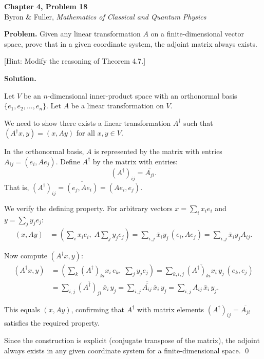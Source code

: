 \documentclass[12pt]{article}
\begin{document}
\begin{center}
{\Large\bfseries Chapter 4, Problem 18}\\[6pt]
Byron \& Fuller, \textit{Mathematics of Classical and Quantum Physics}
\end{center}

\bigskip

\textbf{Problem.} Given any linear transformation $A$ on a finite-dimensional vector space, prove that in a given coordinate system, the adjoint matrix always exists.

[Hint: Modify the reasoning of Theorem 4.7.]

\bigskip
\textbf{Solution.}

Let $V$ be an $n$-dimensional inner-product space with an orthonormal basis $\{e_1, e_2, \ldots, e_n\}$. Let $A$ be a linear transformation on $V$.

We need to show there exists a linear transformation $A^\dagger$ such that $(A^\dagger x, y) = (x, Ay)$ for all $x, y \in V$.

In the orthonormal basis, $A$ is represented by the matrix with entries $A_{ij} = (e_i, Ae_j)$. Define $A^\dagger$ by the matrix with entries:
\[
(A^\dagger)_{ij} = \overline{A_{ji}}.
\]
That is, $(A^\dagger)_{ij} = \overline{(e_j, Ae_i)} = (Ae_i, e_j)$.

We verify the defining property. For arbitrary vectors $x = \sum_i x_i e_i$ and $y = \sum_j y_j e_j$:
\begin{align*}
(x, Ay) &= \left(\sum_i x_i e_i,\; A\sum_j y_j e_j\right) = \sum_{i,j} \bar{x}_i y_j\,(e_i, Ae_j) = \sum_{i,j} \bar{x}_i y_j A_{ij}.
\end{align*}

Now compute $(A^\dagger x, y)$:
\begin{align*}
(A^\dagger x, y) &= \left(\sum_k (A^\dagger)_{ki} x_i\, e_k,\; \sum_j y_j e_j\right) = \sum_{k,i,j} \overline{(A^\dagger)_{ki} x_i}\, y_j\, (e_k, e_j) \\
&= \sum_{i,j} \overline{(A^\dagger)_{ji}}\, \bar{x}_i\, y_j = \sum_{i,j} \overline{\overline{A_{ij}}}\, \bar{x}_i\, y_j = \sum_{i,j} A_{ij}\, \bar{x}_i\, y_j.
\end{align*}

This equals $(x, Ay)$, confirming that $A^\dagger$ with matrix elements $(A^\dagger)_{ij} = \overline{A_{ji}}$ satisfies the required property.

Since the construction is explicit (conjugate transpose of the matrix), the adjoint always exists in any given coordinate system for a finite-dimensional space. \qed
\end{document}
